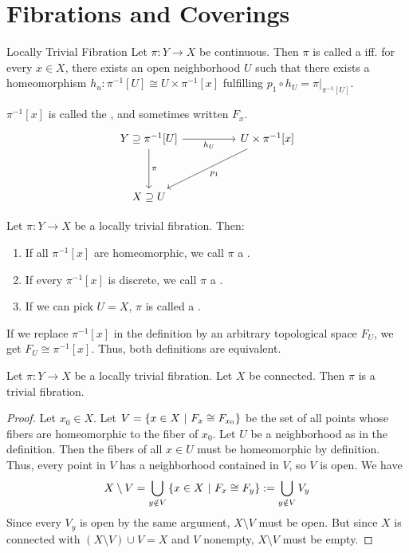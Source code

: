 \chapter{Fibrations and Coverings}
\begin{importantdefinition}{Locally Trivial Fibration}{}
	Let $\pi : Y \to X$ be continuous. Then $\pi$ is called a  iff. for every $x \in X$, there exists an open neighborhood $U$ such that there exists a homeomorphism $h_u : \pi^{-1}[U] \cong U \times \pi^{-1}[x]$ fulfilling $p_1 \circ h_U = \pi|_{\pi^{-1}[U]}$.
\end{importantdefinition}
$\pi^{-1}[x]$ is called the , and sometimes written $F_x$.
\[\begin{tikzcd}
	{Y \supseteq\pi^{-1}[U]} && {U \times \pi^{-1}[x]} \\
	\\
	{X \supseteq U}
	\arrow["{h_U}"', from=1-1, to=1-3]
	\arrow["\pi", from=1-1, to=3-1]
	\arrow["{p_1}", from=1-3, to=3-1]
\end{tikzcd}\]
\begin{definition}
	Let $\pi : Y \to X$ be a locally trivial fibration. Then:
	\begin{enumerate}
		\item If all $\pi^{-1}[x]$ are homeomorphic, we call $\pi$ a .
		\item If every $\pi^{-1}[x]$ is discrete, we call $\pi$ a .
		\item If we can pick $U = X$, $\pi$ is called a .
	\end{enumerate}
\end{definition}
\begin{exercise}
	If we replace $\pi^{-1}[x]$ in the definition by an arbitrary topological space $F_U$, we get $F_U \cong \pi^{-1}[x]$. Thus, both definitions are equivalent.
\end{exercise}
\begin{lemma}
	Let $\pi : Y \to X$ be a locally trivial fibration. Let $X$ be connected. Then $\pi$ is a trivial fibration.
\end{lemma}
\begin{proof}
	Let $x_0 \in X$. Let $V = \qty{x \in X ~\middle|~F_x \cong F_{x_0}}$ be the set of all points whose fibers are homeomorphic to the fiber of $x_0$. Let $U$ be a neighborhood as in the definition. Then the fibers of all $x \in U$ must be homeomorphic by definition. Thus, every point in $V$ has a neighborhood contained in $V$, so $V$ is open. We have
	\begin{align*}
		X \setminus V = \bigcup_{y \notin V} \qty{x \in X ~\middle|~F_x \cong F_y}
		:=
		 \bigcup_{y \notin V} V_y
	\end{align*}
	Since every $V_y$ is open by the same argument, $X \setminus V$ must be open. But since $X$ is connected with $(X \setminus V) \cup V = X$ and $V$ nonempty, $X \setminus V$ must be empty.
\end{proof}
